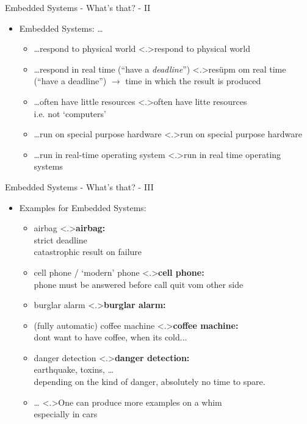 \documentclass[ngerman={babel}, utf8, bigger, t, xcolor={table,dvipsnames}, ompress, hyperref={bookmarks,colorlinks},red]{beamer}
\begin{document}
\begin{frame}{Embedded Systems - What's that? - II}
	\begin{itemize}
		\item Embedded Systems: \dots
		\begin{itemize}
			\item \dots respond to physical world
			\note<.>{respond to physical world}
			\item \dots respond in real time (``have a \emph{deadline}'')
			\note<.>{resüpm om real time \\
			(``have a deadline'') $\to$ time in which the result is produced}
			\item \dots often have little resources
			\note<.>{often have litte resources \\ i.e. not `computers'}
			\item \dots run on special purpose hardware
			\note<.>{run on special purpose hardware}
			\item \dots run in real-time operating system
			\note<.>{run in real time operating systems}
		\end{itemize}
	\end{itemize}
\end{frame}

\begin{frame}{Embedded Systems - What's that? - III}
	\begin{itemize}
		\item Examples for Embedded Systems:
		\begin{itemize}
			\item airbag
			\note<.>{\textbf{airbag:}\\ strict deadline \\ catastrophic result on failure}
			\item cell phone / `modern' phone
			\note<.>{\textbf{cell phone:}\\ phone must be answered before call quit vom other side}
			\item burglar alarm
			\note<.>{\textbf{burglar alarm:}\\ }
			\item (fully automatic) coffee machine
			\note<.>{\textbf{coffee machine:}\\ dont want to have coffee, when its cold...}
			\item danger detection %
			\note<.>{\textbf{danger detection:} \\ earthquake, toxins, \dots \\ depending on the kind of danger, absolutely no time to spare.}
			\item \dots
			\note<.>{One can produce more examples on a whim \\ especially in cars}
		\end{itemize}
	\end{itemize}
\end{frame}
\end{document}
